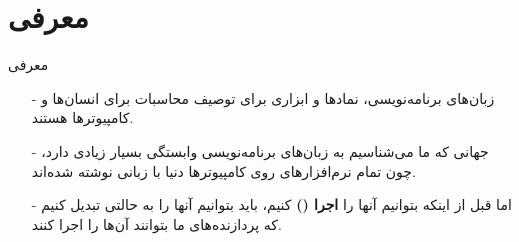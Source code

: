 \section{معرفی}
\begin{frame}{معرفی}
\begin{itemize}\itemr
\item[-]
زبان‌های برنامه‌نویسی، نمادها و ابزاری برای توصیف محاسبات برای انسان‌ها و کامپیوتر‌ها هستند.
\item[-]
جهانی که ما می‌شناسیم به زبان‌های برنامه‌نویسی وابستگی بسیار زیادی دارد، چون تمام نرم‌افزارهای روی کامپیوتر‌ها دنیا با زبانی نوشته شده‌اند.

\item[-]
اما قبل از اینکه بتوانیم آنها را \textbf{اجرا ()} کنیم، باید بتوانیم آنها را به حالتی تبدیل کنیم که پردازنده‌های ما بتوانند آ‌ن‌ها را اجرا کنند.
\end{itemize}
\end{frame}
